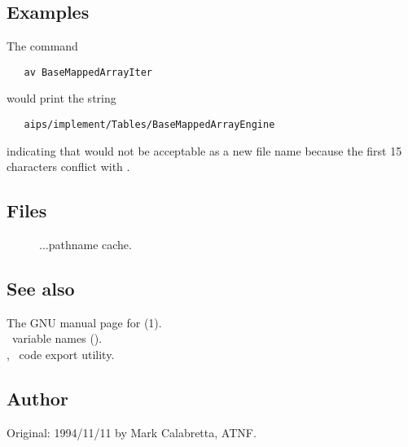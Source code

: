 \subsection*{Examples}

The command

\begin{verbatim}
   av BaseMappedArrayIter
\end{verbatim}

\noindent
would print the string

\begin{verbatim}
   aips/implement/Tables/BaseMappedArrayEngine
\end{verbatim}

\noindent
indicating that  would not be acceptable as a new
file name because the first 15 characters conflict with
.

\subsection*{Files}

\begin{description}
\item[]
...pathname cache.
\end{description}

\subsection*{See also}

The GNU manual page for (1).\\
\aipspp\ variable names ().\\
, \aipspp\ code export utility.

\subsection*{Author}

Original: 1994/11/11 by Mark Calabretta, ATNF.


\newpage
\section{}
\label{avers}

